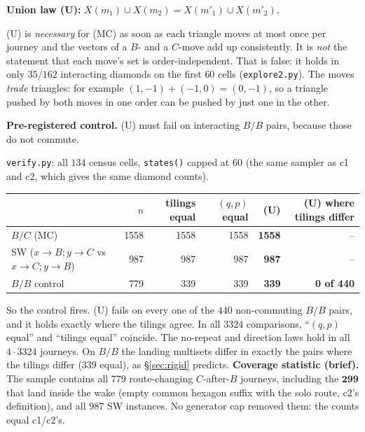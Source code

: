 \documentclass[11pt]{article}
\theoremstyle{definition}
\newcommand{\toB}{\!\to\!B}
\newcommand{\toC}{\!\to\!C}
\begin{document}
\textbf{Union law (U):} $X(m_1)\cup X(m_2)=X(m'_1)\cup X(m'_2)$.

(U) is \emph{necessary} for (MC) as soon as each triangle moves at most once per journey and the vectors of a $B$- and a $C$-move add up
consistently. It is \emph{not} the statement that each move's set is order-independent. That is false: it holds in only $35/162$ interacting diamonds
on the first $60$ cells (\texttt{explore2.py}). The moves \emph{trade} triangles: for example $(1,-1)+(-1,0)=(0,-1)$, so a triangle
pushed by both moves in one order can be pushed by just one in the other.

\textbf{Pre-registered control.} (U) must fail on interacting $B/B$ pairs, because those do not commute.

\texttt{verify.py}: all $134$ census cells, \texttt{states()} capped at $60$ (the same sampler as c1 and c2, which gives the same diamond counts).
\begin{center}\begin{tabular}{lrrrrr}\toprule
& $n$ & tilings equal & $(q,p)$ equal & (U) & (U) where tilings differ\\\midrule
$B/C$ (MC) & 1558 & 1558 & 1558 & \textbf{1558} & --\\
SW ($x\toB;y\toC$ vs $x\toC;y\toB$) & 987 & 987 & 987 & \textbf{987} & --\\
$B/B$ control & 779 & 339 & 339 & \textbf{339} & \textbf{0 of 440}\\\bottomrule
\end{tabular}\end{center}
So the control fires. (U) fails on every one of the $440$ non-commuting $B/B$ pairs, and it holds exactly where the tilings agree. In all
$3324$ comparisons, ``$(q,p)$ equal'' and ``tilings equal'' coincide. The no-repeat and direction laws hold in all $4\cdot3324$ journeys. On
$B/B$ the landing multisets differ in exactly the pairs where the tilings differ ($339$ equal), as \S\ref{sec:rigid} predicts.
\textbf{Coverage statistic (brief).} The sample contains all $779$ route-changing $C$-after-$B$ journeys, including the
$\mathbf{299}$ that land inside the wake (empty common hexagon suffix with the solo route, c2's definition), and all $987$ SW instances. No
generator cap removed them: the counts equal c1/c2's.
\end{document}
